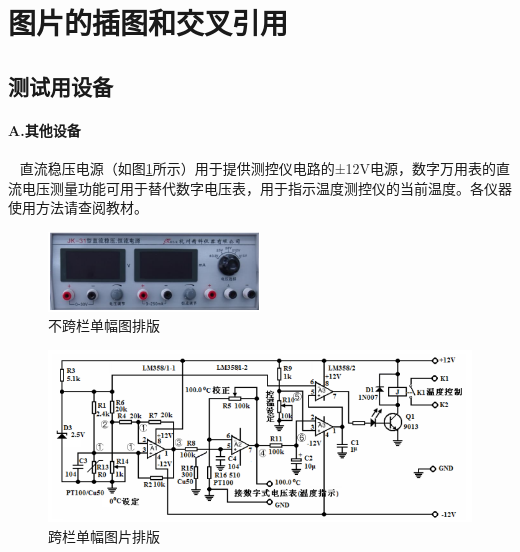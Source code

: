 \documentclass[10pt,a4paper,twocolumn,twoside,UTF8]{ctexart}
\begin{document}


\section{图片的插图和交叉引用}

	\subsection{测试用设备}

	\paragraph{A.其他设备}~
	\newline
	\indent 直流稳压电源（如图\ref{fig:powersource}所示）用于提供测控仪电路的±12V电源，数字万用表的直流电压测量功能可用于替代数字电压表，用于指示温度测控仪的当前温度。各仪器使用方法请查阅教材。
	\begin{figure}[htbp]
		\centering
		\includegraphics[width=0.5\textwidth]{img//device_3.png}
		\caption{不跨栏单幅图排版}
		\label{fig:powersource}
	\end{figure}

	\begin{figure}[htbp]
		\centering
		\includegraphics[width=1\textwidth]{img//Diagram_Cu50.png}
		\caption{跨栏单幅图片排版}
		\label{fig:Diagram_Cu50}
	\end{figure}
\end{document}
